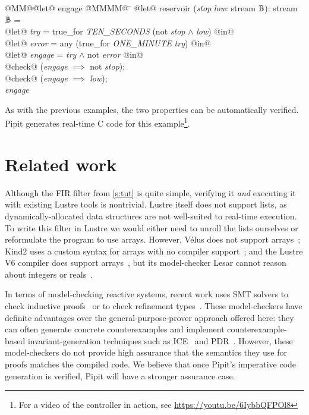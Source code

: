 \documentclass[sigplan,screen, review]{acmart}
\begin{document}
\newcommand\estop{\textit{stop}}
\newcommand\low{\textit{low}}
\newcommand\soltry{\textit{try}}
\newcommand\error{\textit{error}}
\newcommand\solen{\textit{engage}}
\begin{tabbing}
  @MM@\= @let@ engage \= @MMMM@ \= \kill
  @let@ $\mbox{reservoir}$ (\estop{} \low{}: stream $\mathbb{B}$): stream $\mathbb{B}$ = \\
  \> @let@ \soltry{} \> = true\_for \textit{TEN\_SECONDS} (not \estop{} $\wedge$ \low{}) @in@ \\
  \> @let@ \error{} \> = any (true\_for \textit{ONE\_MINUTE} \soltry{}) @in@ \\
  \> @let@ \solen{} \> = \soltry{} $\wedge$ not \error{} @in@ \\
  \> @check@ (\solen{} $\implies$ not \estop{}); \\
  \> @check@ (\solen{} $\implies$ \low{}); \\
  \> \solen{}
\end{tabbing}
\pagebreak

As with the previous examples, the two properties can be automatically verified.
Pipit generates real-time C code for this example\footnote{For a video of the controller in action, see \url{https://youtu.be/6IybbQFPOl8}}.

\section{Related work}
\label{s:related-work}

Although the FIR filter from \autoref{s:tut} is quite simple, verifying it \emph{and} executing it with existing Lustre tools is nontrivial.
Lustre itself does not support lists, as dynamically-allocated data structures are not well-suited to real-time execution.
To write this filter in Lustre we would either need to unroll the lists ourselves or reformulate the program to use arrays.
However, Vélus does not support arrays~\cite{bourke2017formally}; Kind2 uses a custom syntax for arrays with no compiler support~\cite{champion2016kind2}; and the Lustre V6 compiler does support arrays~\cite{jahier2016lustre}, but its model-checker Lesar cannot reason about integers or reals~\cite{raymond2008synchronous}.

In terms of model-checking reactive systems,
recent work uses SMT solvers to check inductive proofs~\cite{hagen2008scaling,champion2016kind2} or to check refinement types~\cite{chen2022synchronous}.
These model-checkers have definite advantages over the general-purpose-prover approach offered here: they can often generate concrete counterexamples and implement counterexample-based invariant-generation techniques such as ICE~\cite{garg2014ice} and PDR~\cite{bradley2011sat,een2011efficient}.
However, these model-checkers do not provide high assurance that the semantics they use for proofs matches the compiled code.
We believe that once Pipit's imperative code generation is verified, Pipit will have a stronger assurance case.
\end{document}
